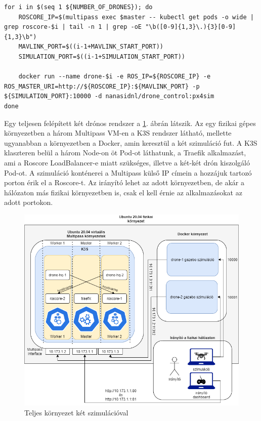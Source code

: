 \begin{minipage}{\linewidth}
\begin{lstlisting}[caption={Drónok indítása külső Docker környezetben}, label={lst:dronedeploy}]
for i in $(seq 1 ${NUMBER_OF_DRONES}); do
	ROSCORE_IP=$(multipass exec $master -- kubectl get pods -o wide | grep roscore-$i | tail -n 1 | grep -oE "\b([0-9]{1,3}\.){3}[0-9]{1,3}\b")
	MAVLINK_PORT=$((i-1+MAVLINK_START_PORT))
	SIMULATION_PORT=$((i-1+SIMULATION_START_PORT))

	docker run --name drone-$i -e ROS_IP=${ROSCORE_IP} -e ROS_MASTER_URI=http://${ROSCORE_IP}:${MAVLINK_PORT} -p ${SIMULATION_PORT}:10000 -d nanasidnl/drone_control:px4sim
done
\end{lstlisting}
\end{minipage}

\noindent
Egy teljesen felépített két drónos rendszer a \ref{fig:full2drone}. ábrán látszik. Az egy fizikai gépes környezetben a három Multipass VM-en a K3S rendszer látható, mellette ugyanabban a környezetben a Docker, amin keresztül a két szimuláció fut. A K3S klaszteren belül a három Node-on öt Pod-ot láthatunk, a Traefik alkalmazást, ami a Roscore LoadBalancer-e miatt szükséges, illetve a két-két drón kiszolgáló Pod-ot. A szimuláció konténerei a Multipass külső IP címein a hozzájuk tartozó porton érik el a Roscore-t. Az irányító lehet az adott környezetben, de akár a hálózaton más fizikai környezetben is, csak el kell érnie az alkalmazásokat az adott portokon.

\begin{figure}
	\centering
	\includegraphics[width=\linewidth]{figures/full2drone.png}
	\caption{Teljes környezet két szimulációval}
	\label{fig:full2drone}
\end{figure}